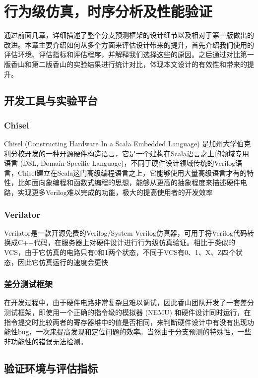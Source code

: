 \chapter{行为级仿真，时序分析及性能验证}

通过前面几章，详细描述了整个分支预测框架的设计细节以及相对于第一版做出的改进。本章主要介绍如何从多个方面来评估设计带来的提升，首先介绍我们使用的评估环境、评估指标和评估程序，并解释我们选择这些的原因。之后通过对比第一版香山和第二版香山的实验结果进行统计对比，体现本文设计的有效性和带来的提升。

\section{开发工具与实验平台}

\subsection{Chisel}

Chisel (Constructing Hardware In a Scala Embedded Language) 是加州大学伯克利分校开发的一种开源硬件构造语言，它是一个建构在Scala语言之上的领域专用语言 (DSL, Domain-Specific Language)，不同于硬件设计领域传统的Verilog语言，Chisel建立在Scala这门高级编程语言之上，它能够使用大量高级语言才有的特性，比如面向象编程和函数式编程的思想，能够从更高的抽象程度来描述硬件电路，实现更多Verilog难以完成的功能，极大的提高使用者的开发效率

\subsection{Verilator}

Verilator是一款开源免费的Verilog/System Verilog仿真器，可用于将Verilog代码转换成C++代码，在服务器上对硬件设计进行行为级仿真验证。相比于类似的VCS，由于它仿真的电路只有0和1两个状态，不同于VCS有0、1、X、Z四个状态，因此它仿真运行的速度会更快

\subsection{差分测试框架}

在开发过程中，由于硬件电路非常复杂且难以调试，因此香山团队开发了一套差分测试框架，即使用一个正确的指令级的模拟器 (NEMU) 和硬件设计同时运行，在指令提交时比较两者的寄存器堆中的值是否相同，来判断硬件设计中有没有出现功能性bug，一次来提高发现和定位问题的效率。当然由于分支预测的特殊性，一些非功能性的错误无法检测。

\section{验证环境与评估指标}


